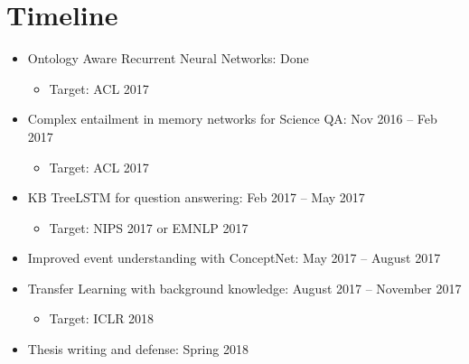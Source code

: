 \section{Timeline}
\begin{itemize}
    \item Ontology Aware Recurrent Neural Networks: Done
    \begin{itemize}
        \item Target: ACL 2017
    \end{itemize}
    \item Complex entailment in memory networks for Science QA: Nov 2016 -- Feb 2017
    \begin{itemize}
        \item Target: ACL 2017
    \end{itemize}
    \item KB TreeLSTM for question answering: Feb 2017 -- May 2017
    \begin{itemize}
        \item Target: NIPS 2017 or EMNLP 2017
    \end{itemize}
    \item Improved event understanding with ConceptNet: May 2017 -- August 2017
    \item Transfer Learning with background knowledge: August 2017 -- November 2017
    \begin{itemize}
        \item Target: ICLR 2018
    \end{itemize}
    \item Thesis writing and defense: Spring 2018
\end{itemize}
